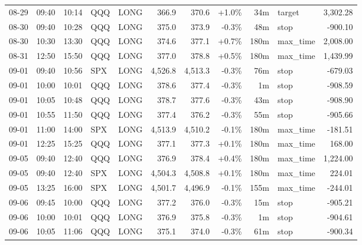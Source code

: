 \documentclass[11pt,a4paper,twoside]{article}
\begin{document}
\begin{center}
\begin{longtable}{>{\color{txtmain}}l l l l l r r r r >{\color{txtmain}}l r}
08-29 & 09:40 & 10:14 & QQQ & LONG & 366.9 & 370.6 & \textcolor{wingreen}{+1.0\%} & 34m & target & \textcolor{wingreen}{3,302.28} \\
08-30 & 09:40 & 10:28 & QQQ & LONG & 375.0 & 373.9 & \textcolor{lossred}{-0.3\%} & 48m & stop & \textcolor{lossred}{-900.10} \\
08-30 & 10:30 & 13:30 & QQQ & LONG & 374.6 & 377.1 & \textcolor{wingreen}{+0.7\%} & 180m & max\_time & \textcolor{wingreen}{2,008.00} \\
08-31 & 12:50 & 15:50 & QQQ & LONG & 377.0 & 378.8 & \textcolor{wingreen}{+0.5\%} & 180m & max\_time & \textcolor{wingreen}{1,439.99} \\
09-01 & 09:40 & 10:56 & SPX & LONG & 4,526.8 & 4,513.3 & \textcolor{lossred}{-0.3\%} & 76m & stop & \textcolor{lossred}{-679.03} \\
09-01 & 10:00 & 10:01 & QQQ & LONG & 378.6 & 377.4 & \textcolor{lossred}{-0.3\%} & 1m & stop & \textcolor{lossred}{-908.59} \\
09-01 & 10:05 & 10:48 & QQQ & LONG & 378.7 & 377.6 & \textcolor{lossred}{-0.3\%} & 43m & stop & \textcolor{lossred}{-908.90} \\
09-01 & 10:55 & 11:50 & QQQ & LONG & 377.4 & 376.2 & \textcolor{lossred}{-0.3\%} & 55m & stop & \textcolor{lossred}{-905.66} \\
09-01 & 11:00 & 14:00 & SPX & LONG & 4,513.9 & 4,510.2 & \textcolor{lossred}{-0.1\%} & 180m & max\_time & \textcolor{lossred}{-181.51} \\
09-01 & 12:25 & 15:25 & QQQ & LONG & 377.1 & 377.3 & \textcolor{wingreen}{+0.1\%} & 180m & max\_time & \textcolor{wingreen}{168.00} \\
09-05 & 09:40 & 12:40 & QQQ & LONG & 376.9 & 378.4 & \textcolor{wingreen}{+0.4\%} & 180m & max\_time & \textcolor{wingreen}{1,224.00} \\
09-05 & 09:40 & 12:40 & SPX & LONG & 4,504.3 & 4,508.8 & \textcolor{wingreen}{+0.1\%} & 180m & max\_time & \textcolor{wingreen}{224.01} \\
09-05 & 13:25 & 16:00 & SPX & LONG & 4,501.7 & 4,496.9 & \textcolor{lossred}{-0.1\%} & 155m & max\_time & \textcolor{lossred}{-244.01} \\
09-06 & 09:45 & 10:00 & QQQ & LONG & 377.2 & 376.0 & \textcolor{lossred}{-0.3\%} & 15m & stop & \textcolor{lossred}{-905.21} \\
09-06 & 10:00 & 10:01 & QQQ & LONG & 376.9 & 375.8 & \textcolor{lossred}{-0.3\%} & 1m & stop & \textcolor{lossred}{-904.61} \\
09-06 & 10:05 & 11:06 & QQQ & LONG & 375.1 & 374.0 & \textcolor{lossred}{-0.3\%} & 61m & stop & \textcolor{lossred}{-900.34} \\

\end{longtable}
\end{center}
\end{document}
